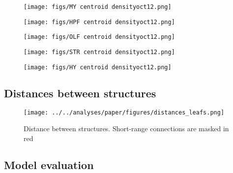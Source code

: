 \begin{figure}[H]
    \centering
    \texttt{[image: figs/MY centroid densityoct12.png]} 
    \label{fig:my_label}
\end{figure}
\newpage

\begin{figure}[H]
    \centering
    \texttt{[image: figs/HPF centroid densityoct12.png]} 
    \label{fig:my_label}
\end{figure}
\newpage

\begin{figure}[H]
    \centering
    \texttt{[image: figs/OLF centroid densityoct12.png]} 
    \label{fig:my_label}
\end{figure}
\newpage

\begin{figure}[H]
    \centering
    \texttt{[image: figs/STR centroid densityoct12.png]} 
    \label{fig:my_label}
\end{figure}
\newpage

\begin{figure}[H]
    \centering
    \texttt{[image: figs/HY centroid densityoct12.png]} 
    \label{fig:my_label}
\end{figure}

\newpage

\subsection{Distances between structures}

\begin{figure}[H]
    \centering
    \texttt{[image: ../../analyses/paper/figures/distances\_leafs.png]} 
    \label{fig:distances}
    \caption{Distance between structures.  Short-range connections are masked in red}
\end{figure}

\subsection{Model evaluation}
\label{supp_sec:model-evaluation}

